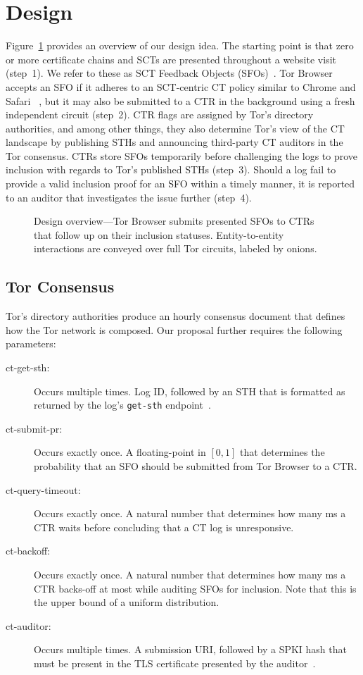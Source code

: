 \section{Design}
Figure~\ref{fig:overview} provides an overview of our design idea.  The starting
point is that zero or more certificate chains and SCTs are presented
throughout a website visit (step~1).  We refer to these as SCT Feedback Objects
(SFOs)~\cite{nordberg}.  Tor Browser accepts an SFO if it adheres to an
SCT-centric CT policy similar to Chrome and Safari~%
\cite{chrome-policy,safari-policy}, but it may also be submitted to a CTR
in the background using a fresh independent circuit (step~2).  CTR flags are
assigned by Tor's directory authorities, and among other things, they also
determine Tor's view of the CT landscape by publishing STHs and announcing
third-party CT auditors in the Tor consensus.  CTRs store SFOs temporarily
before challenging the logs to prove inclusion with regards to Tor's published
STHs (step~3).  Should a log fail to provide a valid inclusion proof for an SFO
within a timely manner, it is reported to an auditor that investigates the issue
further (step~4).
\begin{figure}
	\centering
	
	\caption{%
		Design overview---Tor Browser submits presented SFOs to CTRs that follow
		up on their inclusion statuses.  Entity-to-entity interactions are
		conveyed over full Tor circuits, labeled by onions.
	}
	\label{fig:overview}
\end{figure}

\subsection{Tor Consensus}
Tor's directory authorities produce an hourly consensus document that defines
how the Tor network is composed.  Our proposal further requires the following
parameters:
\begin{description}
	\item[ct-get-sth:] Occurs multiple times.  Log ID, followed by an STH that is
		formatted as returned by the log's \texttt{get-sth}
		endpoint~\cite{ct,ct/bis}.
	\item[ct-submit-pr:] Occurs exactly once.  A floating-point in $[0,1]$
		that determines the probability that an SFO should be submitted from Tor
		Browser to a CTR.
	\item[ct-query-timeout:] Occurs exactly once.  A natural number that
		determines how many ms a CTR waits before concluding that a CT log is
		unresponsive.
	\item[ct-backoff:] Occurs exactly once.  A natural number that determines
		how many ms a CTR backs-off at most while auditing SFOs for inclusion.
		Note that this is the upper bound of a uniform distribution.
	\item[ct-auditor:] Occurs multiple times.  A submission URI, followed by a
		SPKI hash that must be present in the TLS certificate presented by the
		auditor~\cite{hpkp}.
\end{description}

